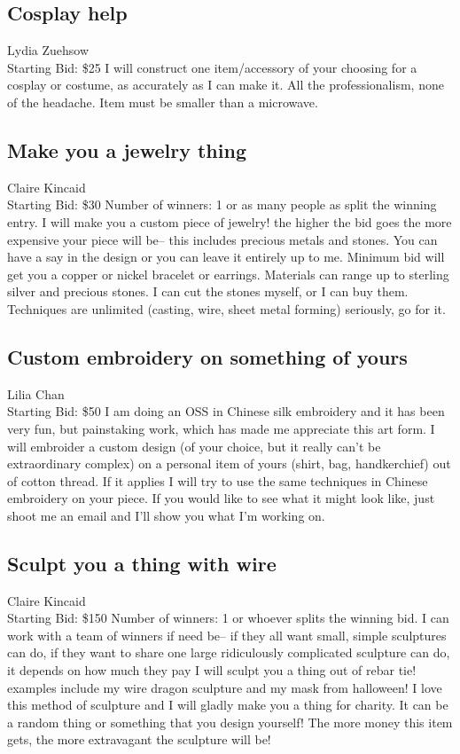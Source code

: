 \documentclass[11pt]{article}
\begin{document}
\subsection{Cosplay help}
Lydia Zuehsow
\\
Starting Bid: \$25
\newline
I will construct one item/accessory of your choosing for a cosplay or costume, as accurately as I can make it. All the professionalism, none of the headache.
Item must be smaller than a microwave.
\subsection{Make you a jewelry thing}
Claire Kincaid
\\
Starting Bid: \$30
\newline
Number of winners: 1 or as many people as split the winning entry.
\newline
I will make you a custom piece of jewelry!  the higher the bid goes the more expensive your piece will be-- this includes precious metals and stones. You can have a say in the design or you can leave it entirely up to me.  Minimum bid will get you a copper or nickel bracelet or earrings.  Materials can range up to sterling silver and precious stones.  I can cut the stones myself, or I can buy them.  Techniques are unlimited (casting, wire, sheet metal forming) seriously, go for it.
\subsection{Custom embroidery on something of yours}
Lilia Chan
\\
Starting Bid: \$50
\newline
I am doing an OSS in Chinese silk embroidery and it has been very fun, but painstaking work, which has made me appreciate this art form. I will embroider a custom design (of your choice, but it really can't be extraordinary complex) on a personal item of yours (shirt, bag, handkerchief) out of cotton thread. If it applies I will try to use the same techniques in Chinese embroidery on your piece. If you would like to see what it might look like, just shoot me an email and I'll show you what I'm working on.
\subsection{Sculpt you a thing with wire}
Claire Kincaid
\\
Starting Bid: \$150
\newline
Number of winners: 1 or whoever splits the winning bid.  I can work with a team of winners if need be-- if they all want small, simple sculptures can do, if they want to share one large ridiculously complicated sculpture can do, it depends on how much they pay
\newline
I will sculpt you a thing out of rebar tie! examples include my wire dragon sculpture and my mask from halloween!  I love this method of sculpture and I will gladly make you a thing for charity.  It can be a random thing or something that you design yourself! The more money this item gets, the more extravagant the sculpture will be!
\end{document}
